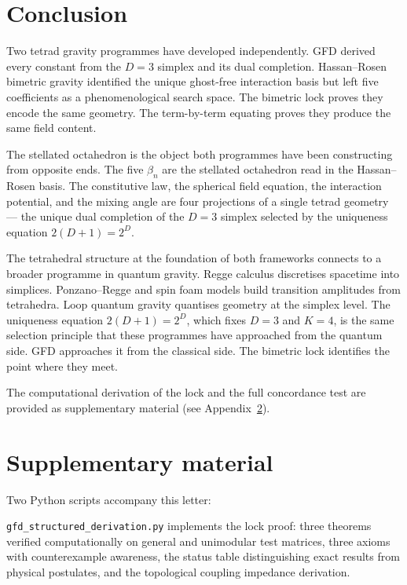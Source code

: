 \documentclass[twocolumn,showpacs,preprintnumbers,amsmath,amssymb,prd]{revtex4-2}
\begin{document}

\section{Conclusion}
\label{sec:conclusion}

Two tetrad gravity programmes have developed independently. GFD derived every constant from the $D = 3$ simplex and its dual completion. Hassan--Rosen bimetric gravity identified the unique ghost-free interaction basis but left five coefficients as a phenomenological search space. The bimetric lock proves they encode the same geometry. The term-by-term equating proves they produce the same field content.

The stellated octahedron is the object both programmes have been constructing from opposite ends. The five $\beta_n$ are the stellated octahedron read in the Hassan--Rosen basis. The constitutive law, the spherical field equation, the interaction potential, and the mixing angle are four projections of a single tetrad geometry --- the unique dual completion of the $D = 3$ simplex selected by the uniqueness equation $2(D+1) = 2^D$.

The tetrahedral structure at the foundation of both frameworks connects to a broader programme in quantum gravity. Regge calculus discretises spacetime into simplices. Ponzano--Regge and spin foam models build transition amplitudes from tetrahedra. Loop quantum gravity quantises geometry at the simplex level. The uniqueness equation $2(D+1) = 2^D$, which fixes $D = 3$ and $K = 4$, is the same selection principle that these programmes have approached from the quantum side. GFD approaches it from the classical side. The bimetric lock identifies the point where they meet.

The computational derivation of the lock and the full concordance test are provided as supplementary material (see Appendix~\ref{app:supp}).

\appendix

\section{Supplementary material}
\label{app:supp}

Two Python scripts accompany this letter:

\texttt{gfd\_structured\_derivation.py} implements the lock proof: three theorems verified computationally on general and unimodular test matrices, three axioms with counterexample awareness, the status table distinguishing exact results from physical postulates, and the topological coupling impedance derivation.
\end{document}
